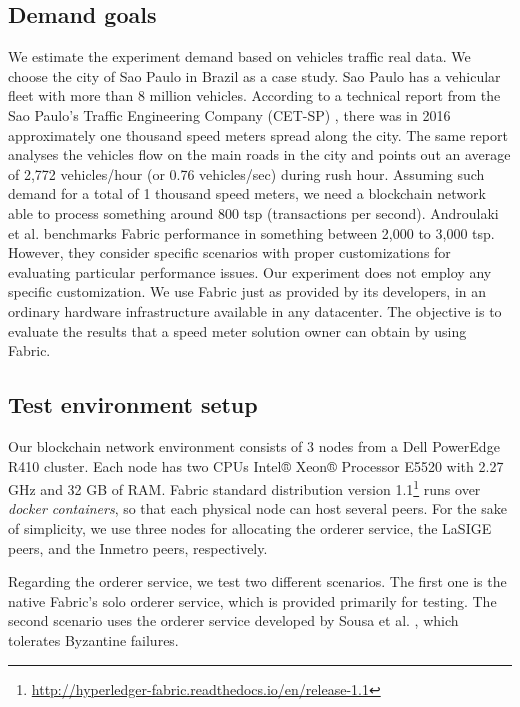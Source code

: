 \documentclass[journal]{IEEEtran}
\begin{document}
\subsection{Demand goals}
We estimate the experiment demand based on vehicles traffic real data.
We choose the city of Sao Paulo in Brazil as a case study.
Sao Paulo has a vehicular fleet with more than 8 million vehicles.
According to a technical report from the Sao Paulo's Traffic Engineering Company 
(CET-SP) \cite{CompanhiadeEngenhariadeTrafego-CET2017}, there was in 2016 approximately one thousand speed meters spread along the city.
The same report analyses the vehicles flow on the main roads in the city and points out an average of 2,772 vehicles/hour (or 0.76 vehicles/sec) during rush hour.
Assuming such demand for a total of 1 thousand speed meters, we need a blockchain network able to process something around 800 tsp (transactions per second).
Androulaki et al. \cite{Androulaki2018} benchmarks Fabric performance in something between 2,000 to 3,000 tsp.
However, they consider specific scenarios with proper customizations for evaluating particular performance issues.
Our experiment does not employ any specific customization.
We use Fabric just as provided by its developers, in an ordinary hardware infrastructure available in any datacenter.
The objective is to evaluate the results that a speed meter solution owner can obtain by using Fabric.

\subsection{Test environment setup}
Our blockchain network environment consists of 3 nodes from a Dell PowerEdge R410 cluster.
Each node has two CPUs Intel® Xeon® Processor E5520 with 2.27 GHz and 32 GB of RAM.
Fabric standard distribution version 1.1\footnote{\url{http://hyperledger-fabric.readthedocs.io/en/release-1.1}} runs over \emph{docker containers}, so that each physical node can host several peers.
For the sake of simplicity, we use three nodes for allocating the orderer service, the LaSIGE peers, and the Inmetro peers, respectively.

Regarding the orderer service, we test two different scenarios.
The first one is the native Fabric's solo orderer service, which is provided primarily for testing.
The second scenario uses the orderer service developed by Sousa et al. \cite{Sousa2018}, which tolerates Byzantine failures.
\end{document}
